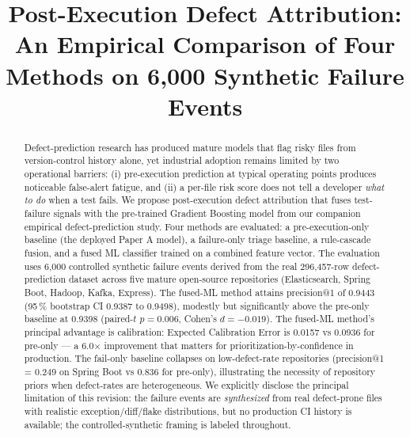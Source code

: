 \documentclass[conference]{IEEEtran}
\begin{document}
\title{Post-Execution Defect Attribution: An Empirical Comparison of Four Methods on 6,000 Synthetic Failure Events}

\author{
}

\maketitle

\begin{abstract}
\noindent Defect-prediction research has produced mature models that flag
risky files from version-control history alone, yet industrial adoption
remains limited by two operational barriers: (i) pre-execution prediction
at typical operating points produces noticeable false-alert fatigue, and
(ii) a per-file risk score does not tell a developer \emph{what to do}
when a test fails. We propose post-execution defect attribution
that fuses test-failure signals with the pre-trained Gradient Boosting
model from our companion empirical defect-prediction study. Four methods
are evaluated: a pre-execution-only baseline (the deployed Paper A
model), a failure-only triage baseline, a rule-cascade fusion, and a
fused ML classifier trained on a combined feature vector. The evaluation
uses 6{,}000 controlled synthetic failure events derived from the real
296{,}457-row defect-prediction dataset across five mature open-source
repositories (Elasticsearch, Spring Boot, Hadoop, Kafka, Express).
The fused-ML method attains precision@1 of 0.9443 (95\,\% bootstrap CI
0.9387 to 0.9498), modestly but significantly above the pre-only
baseline at 0.9398 (paired-$t$ $p=0.006$, Cohen's $d=-0.019$). The
fused-ML method's principal advantage is calibration: Expected
Calibration Error is 0.0157 vs 0.0936 for pre-only --- a 6.0$\times$
improvement that matters for prioritization-by-confidence in
production. The fail-only baseline collapses on low-defect-rate
repositories (precision@1 = 0.249 on Spring Boot vs 0.836 for
pre-only), illustrating the necessity of repository priors when
defect-rates are heterogeneous. We explicitly disclose the principal
limitation of this revision: the failure events are
\emph{synthesized} from real defect-prone files with realistic
exception/diff/flake distributions, but no production CI history is
available; the controlled-synthetic framing is labeled throughout.
\end{abstract}
\end{document}
